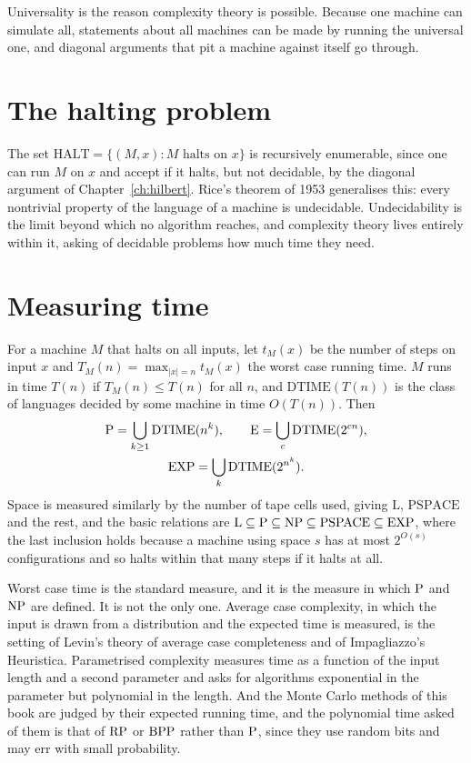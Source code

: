 Universality is the reason complexity theory is possible. Because one machine can simulate all, statements about all machines can be made by running the universal one, and diagonal arguments that pit a machine against itself go through.

\section{The halting problem}

The set $\mathrm{HALT} = \{ (M, x) : M \text{ halts on } x \}$ is recursively enumerable, since one can run $M$ on $x$ and accept if it halts, but not decidable, by the diagonal argument of Chapter~\ref{ch:hilbert}. Rice's theorem of 1953 generalises this: every nontrivial property of the language of a machine is undecidable. Undecidability is the limit beyond which no algorithm reaches, and complexity theory lives entirely within it, asking of decidable problems how much time they need.

\section{Measuring time}

For a machine $M$ that halts on all inputs, let $t_M(x)$ be the number of steps on input $x$ and $T_M(n) = \max_{|x| = n} t_M(x)$ the worst case running time. $M$ runs in time $T(n)$ if $T_M(n) \le T(n)$ for all $n$, and $\mathrm{DTIME}(T(n))$ is the class of languages decided by some machine in time $O(T(n))$. Then
\[
\begin{gathered}
\mathrm{P} = \bigcup_{k \ge 1} \mathrm{DTIME}(n^k) , \qquad \mathrm{E} = \bigcup_{c} \mathrm{DTIME}(2^{cn}) , \\ \mathrm{EXP} = \bigcup_{k} \mathrm{DTIME}(2^{n^k}) .
\end{gathered}
\]
Space is measured similarly by the number of tape cells used, giving $\mathrm{L}$, $\mathrm{PSPACE}$ and the rest, and the basic relations are $\mathrm{L} \subseteq \mathrm{P} \subseteq \mathrm{NP} \subseteq \mathrm{PSPACE} \subseteq \mathrm{EXP}$, where the last inclusion holds because a machine using space $s$ has at most $2^{O(s)}$ configurations and so halts within that many steps if it halts at all.

Worst case time is the standard measure, and it is the measure in which $\mathrm{P}$ and $\mathrm{NP}$ are defined. It is not the only one. Average case complexity, in which the input is drawn from a distribution and the expected time is measured, is the setting of Levin's theory of average case completeness and of Impagliazzo's Heuristica. Parametrised complexity measures time as a function of the input length and a second parameter and asks for algorithms exponential in the parameter but polynomial in the length. And the Monte Carlo methods of this book are judged by their expected running time, and the polynomial time asked of them is that of $\mathrm{RP}$ or $\mathrm{BPP}$ rather than $\mathrm{P}$, since they use random bits and may err with small probability.

